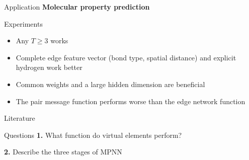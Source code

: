 \documentclass[13pt]{beamer}				\usepackage{graphicx}
\begin{document}
\begin{frame}{Application}
\textbf{Molecular property prediction}

Experiments
\begin{itemize}
\item Any $T \geq 3$ works
\item Complete edge feature vector (bond type, spatial distance) and explicit hydrogen work better
\item Common weights and a large hidden dimension are beneficial
\item The pair message function performs worse than the edge network function 
\end{itemize}

\end{frame}

\begin{frame}{Literature}
\nocite{mpnn}
\printbibliography
\end{frame}

\begin{frame}{Questions}
\textbf{1.} What function do virtual elements perform?

\textbf{2.} Describe the three stages of MPNN

\end{frame}
\end{document}
